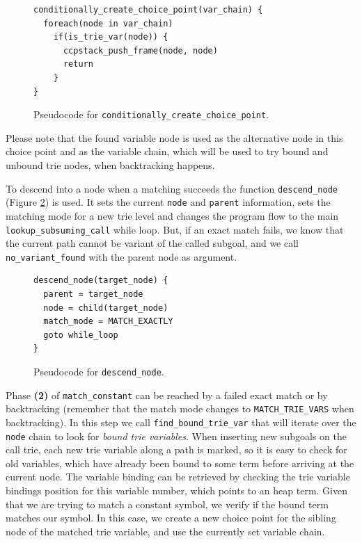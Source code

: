 \begin{figure}[ht]
\begin{Verbatim}[fontsize=\small]
conditionally_create_choice_point(var_chain) {
  foreach(node in var_chain)
    if(is_trie_var(node)) {
      ccpstack_push_frame(node, node)
      return
    }
}
\end{Verbatim}
\caption{Pseudo\-code for \texttt{conditionally\_create\_choice\_point}.}
\label{fig:conditionally_create_choice_point}
\end{figure}

Please note that the found variable node is used as the alternative node in this choice point
and as the variable chain, which will be used to try bound and unbound trie nodes, when backtracking happens.

To descend into a node when a matching succeeds the function \texttt{descend\_node} (Figure \ref{fig:descend_node})
is used. It sets the current \texttt{node} and \texttt{parent} information, sets the matching mode for a new trie level
and changes the program flow to the main \texttt{lookup\_subsuming\_call} while loop. But,
if an exact match fails, we know that the current path cannot be variant of the called subgoal, and we call
\texttt{no\_variant\_found} with the parent node as argument.

\begin{figure}[ht]
\begin{Verbatim}[fontsize=\small]
descend_node(target_node) {
  parent = target_node
  node = child(target_node)
  match_mode = MATCH_EXACTLY
  goto while_loop
}
\end{Verbatim}
\caption{Pseudo\-code for \texttt{descend\_node}.}
\label{fig:descend_node}
\end{figure}

Phase \textbf{(2)} of \texttt{match\_constant} can be reached by a failed exact match or by backtracking
(remember that the match mode changes to \texttt{MATCH\_TRIE\_VARS} when backtracking). In this step
we call \texttt{find\_bound\_trie\_var} that will iterate over the \texttt{node} chain to look for
\textit{bound trie variables}. When inserting new subgoals on the call trie, each new trie variable
along a path is marked, so it is easy to check for old variables, which have already been bound
to some term before arriving at the current node. The variable binding can be retrieved by
checking the trie variable bindings position for this variable number, which points to an heap term.
Given that we are trying to match a constant symbol, we verify if the bound term matches our symbol.
In this case, we create a new choice point for the sibling node of the matched trie variable, and use
the currently set variable chain.

